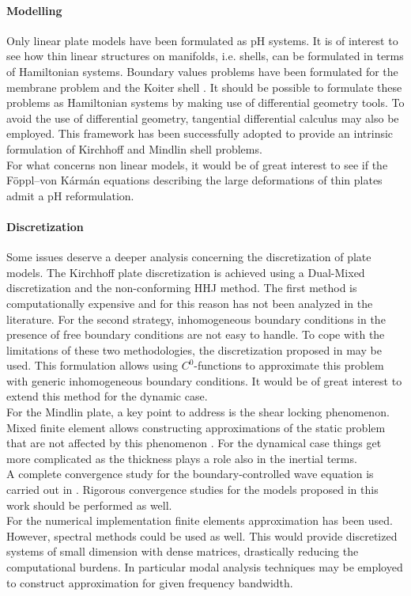 \paragraph{Modelling}
Only linear plate models have been formulated as pH systems. It is of interest to see how thin linear structures on manifolds, i.e. shells, can be formulated in terms of Hamiltonian systems. Boundary values problems have been formulated for the membrane problem and the Koiter shell \cite{ciarlet2000shells}. It should be possible to formulate these problems as Hamiltonian systems by making use of differential geometry tools. To avoid the use of differential geometry, tangential differential calculus \cite{delfour2011shapes} may also be employed. This framework has been successfully adopted to provide an intrinsic formulation of Kirchhoff \cite{schollhammer2019kirchhoff} and Mindlin \cite{schollhammer2019reissner} shell problems. \\
For what concerns non linear models, it would be of great interest to see if the F\"oppl–von K\'arm\'an equations describing the large deformations of thin plates \cite{bilbao2015conservative} admit a pH reformulation. \\


\paragraph{Discretization}
Some issues deserve a deeper analysis concerning the discretization of plate models. The Kirchhoff plate discretization is achieved using a Dual-Mixed discretization and the non-conforming HHJ method. The first method is computationally expensive and for this reason has not been analyzed in the literature. For the second strategy, inhomogeneous boundary conditions in the presence of free boundary conditions are not easy to handle. To cope with the limitations of these two methodologies, the discretization proposed in \cite{rafetseder2018siam} may be used.  This formulation allows using $C^0$-functions to approximate this problem with generic inhomogeneous boundary conditions. It would be of great interest to extend this method for the dynamic case. \\ For the Mindlin plate, a key point to address is the shear locking phenomenon. Mixed finite element allows constructing approximations of the static problem that are not affected by this phenomenon \cite{veiga2013}. For the dynamical case things get more complicated as the thickness plays a role also in the inertial terms. \\ A complete convergence study for the boundary-controlled wave equation is carried out in \cite{haine2020}. Rigorous convergence studies for the models proposed in this work should be performed as well. \\ For the numerical implementation finite elements approximation has been used. However, spectral methods could be used as well. This would provide discretized systems of small dimension with dense matrices, drastically reducing the computational burdens. In particular modal analysis techniques may be employed to construct approximation for given frequency bandwidth.

